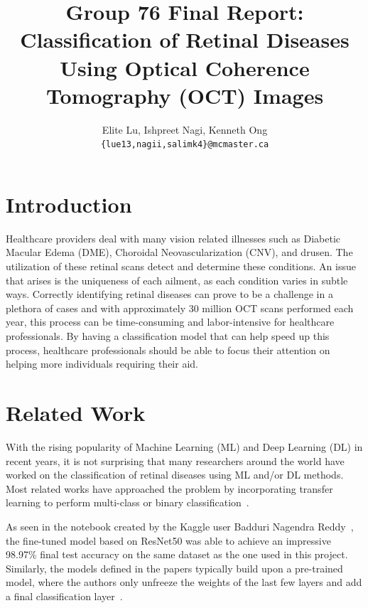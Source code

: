 \documentclass[11pt]{article}
\title{Group 76 Final Report: Classification of Retinal Diseases Using Optical Coherence Tomography (OCT) Images}
\author{Elite Lu, Ishpreet Nagi, Kenneth Ong \\
  \texttt{\{lue13,nagii,salimk4\}@mcmaster.ca} }
\begin{document}
\maketitle






\section{Introduction}

Healthcare providers deal with many vision related illnesses such as Diabetic Macular Edema (DME), Choroidal Neovascularization (CNV), and drusen. The utilization of these retinal scans detect and determine these conditions. An issue that arises is the uniqueness of each ailment, as each condition varies in subtle ways. Correctly identifying retinal diseases can prove to be a challenge in a plethora of cases and with approximately 30 million OCT scans performed each year, this process can be time-consuming and labor-intensive for healthcare professionals. By having a classification model that can help speed up this process, healthcare professionals should be able to focus their attention on helping more individuals requiring their aid.

\section{Related Work}

With the rising popularity of Machine Learning (ML) and Deep Learning (DL) in recent years, it is not surprising that many researchers around the world have worked on the classification of retinal diseases using ML and/or DL methods. Most related works have approached the problem by incorporating transfer learning to perform multi-class or binary classification~\citep{Kermany2018-dc, Miladinovic2024-og,Reddy_2025-nr}.

As seen in the notebook created by the Kaggle user Badduri Nagendra Reddy~\citeyearpar{Reddy_2025-nr}, the fine-tuned model based on ResNet50 was able to achieve an impressive 98.97\% final test accuracy on the same dataset as the one used in this project. Similarly, the models defined in the papers typically build upon a pre-trained model, where the authors only unfreeze the weights of the last few layers and add a final classification layer~\citep{Kermany2018-dc,Miladinovic2024-og}.
\end{document}
